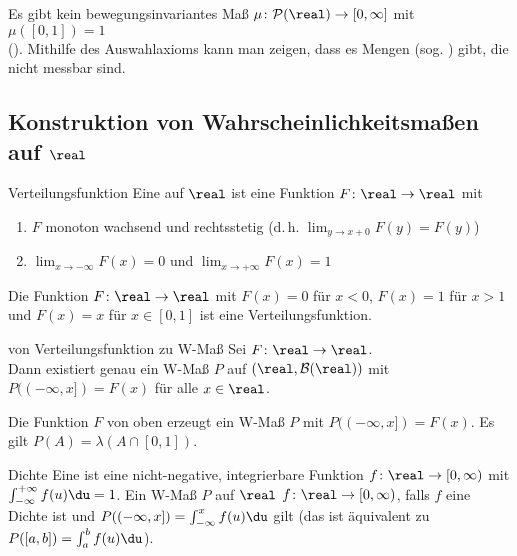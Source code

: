 \begin{Bem}
    Es gibt kein bewegungsinvariantes Maß $\mu\colon \P(\real) \rightarrow [0, \infty]$ mit
    $\mu([0, 1]) = 1$\\
    ().
    Mithilfe des Auswahlaxioms kann man zeigen, dass es Mengen
    (sog. ) gibt, die nicht messbar sind.
\end{Bem}

\pagebreak

\subsection{%
    Konstruktion von Wahrscheinlichkeitsmaßen auf \texorpdfstring{$\real$}{ℝ}%
}

\begin{Def}{Verteilungsfunktion}
    Eine  auf $\real$ ist eine Funktion
    $F\colon \real \rightarrow \real$ mit
    \begin{enumerate}
        \item
        $F$ monoton wachsend und rechtsstetig (d.\,h. $\lim_{y \to x+0} F(y) = F(y)$)
        
        \item
        $\lim_{x \to -\infty} F(x) = 0$ und $\lim_{x \to +\infty} F(x) = 1$
    \end{enumerate}
\end{Def}

\begin{Bsp}
    Die Funktion $F\colon \real \rightarrow \real$ mit
    $F(x) = 0$ für $x < 0$, $F(x) = 1$ für $x > 1$ und
    $F(x) = x$ für $x \in [0, 1]$ ist eine Verteilungsfunktion.
\end{Bsp}

\begin{Satz}{von Verteilungsfunktion zu W-Maß}
    Sei $F\colon \real \rightarrow \real$.\\
    Dann existiert genau ein W-Maß $P$ auf $(\real, \B(\real))$ mit $P((-\infty, x]) = F(x)$
    für alle $x \in \real$.
\end{Satz}

\begin{Bsp}
    Die Funktion $F$ von oben erzeugt ein W-Maß $P$ mit $P((-\infty, x]) = F(x)$.
    Es gilt $P(A) = \lambda(A \cap [0, 1])$.
\end{Bsp}

\linie

\begin{Def}{Dichte}
    Eine  ist eine nicht-negative, integrierbare Funktion
    $f\colon \real \rightarrow [0, \infty)$ mit $\int_{-\infty}^{+\infty} f(u)\du = 1$.
    Ein W-Maß $P$ auf $\real$ 
    $f\colon \real \rightarrow [0, \infty)$,
    falls $f$ eine Dichte ist und $P((-\infty, x]) = \int_{-\infty}^x f(u)\du$ gilt
    (das ist äquivalent zu $P([a, b]) = \int_a^b f(u)\du$).
\end{Def}

